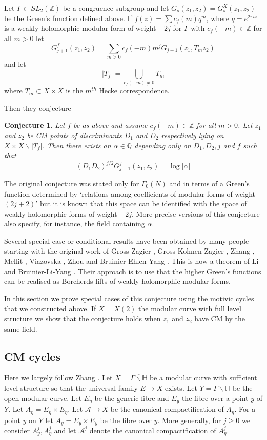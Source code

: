 \documentclass[11pt,a4paper]{article}
\newtheorem {conj}[defn]{Conjecture}
\newcommand {\ZZ}{{\mathds Z}}
\newcommand {\A}{{\mathcal A}}
\newcommand {\Q}{{\mathds Q}}
\newcommand {\HH}{{\mathds H}}
\begin{document}
Let $\Gamma \subset SL_2(\ZZ)$ be a congruence subgroup  and let $G_s(z_1,z_2)=G^X_s(z_1,z_2)$ be the Green's function defined above.
If $f(z)=\sum c_f(m) q^m$, where $q=e^{2\pi iz}$ is a weakly holomorphic modular form of weight $-2j$  for $\Gamma$ with $c_f(-m) \in \ZZ$ for all $m>0$ let 
%
$$G^f_{j+1}(z_1,z_2)=\sum_{m>0} c_f(-m)m^j G_{j+1}(z_1,T_mz_2)$$
%
and let 
%
$$|T_f|=\bigcup_{c_f(-m)\neq 0} T_m$$
%
where $T_m \subset X \times X$ is the $m^{th}$ Hecke correspondence. 

Then they conjecture
\begin{conj} Let $f$ be as above and assume $c_f(-m) \in \ZZ$ for all $m>0$. Let $z_1$ and $z_2$ be CM points of discriminants $D_1$ and $D_2$  respectively lying on $X\times X \backslash |T_f|$.  Then there exists an $\alpha  \in \bar{\Q}$  depending only on $D_1, D_2, j$ and $f$  such that 
	$$(D_1D_2)^{j/2} G^f_{j+1}(z_1,z_2)=\log|\alpha|$$
	
	
\end{conj}

The original conjecture was stated only for $\Gamma_0(N)$ and  in terms of a Green's function determined by `relations among coefficients of modular forms of weight $(2j+2)$' but it is known that this space can be identified with the space of weakly holomorphic forms of weight $-2j$. More precise versions of this conjecture also specify, for instance, the field containing $\alpha$. 

Several special case or conditional results have been obtained by many people - starting with the original work of  Gross-Zagier \cite{grza}, Gross-Kohnen-Zagier \cite{GKZ}, Zhang \cite{zhan}, Mellit \cite{mell}, Viazovska \cite{viaz}, Zhou \cite{zhou} and Bruinier-Ehlen-Yang \cite{BEY}. This is now a theorem of Li \cite{li} and Bruinier-Li-Yang \cite{BLY}. Their  approach is to use that the higher Green's functions can be realised as Borcherds lifts of weakly holomorphic modular forms. 

In this section we prove  special cases of this conjecture using the motivic cycles that we constructed above.  If $X=X(2)$ the modular curve with full level structure we show that the conjecture holds when $z_1$ and $z_2$ have CM by the same field. 

\subsection{CM cycles}
\label{cmcycles}

Here we largely follow Zhang \cite{zhan}. Let $X=\overline{\Gamma \backslash \HH}$ be a modular curve with sufficient level structure so that the universal family  $E \rightarrow X$ exists. Let $Y=\Gamma \backslash \HH$ be the open modular curve. Let $E_{\eta}$ be the generic fibre and $E_y$ the fibre over a point $y$ of $Y$.  Let $A_{\eta}=E_{\eta}\times E_{\eta}$. Let $\A \rightarrow X$ be the canonical compactification of $A_{\eta}$. For a point $y$ on $Y$ let $A_y=E_y \times E_y$ be the fibre over $y$. More generally, for $j\geq 0$ we consider $A_y^j,A_{\eta}^j$ and let $\A^j$ denote the canonical compactification of $A_{\eta}^j$. 
\end{document}
